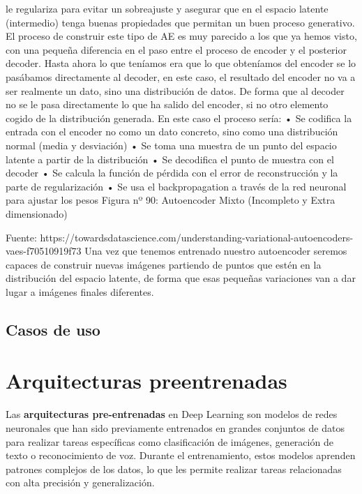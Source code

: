 \documentclass[
  a4paper,
  DIV=11,
  numbers=noendperiod]{scrreprt}
\begin{document}
le regulariza para evitar un sobreajuste y asegurar que en el espacio
latente (intermedio) tenga buenas propiedades que permitan un buen
proceso generativo. El proceso de construir este tipo de AE es muy
parecido a los que ya hemos visto, con una pequeña diferencia en el paso
entre el proceso de encoder y el posterior decoder. Hasta ahora lo que
teníamos era que lo que obteníamos del encoder se lo pasábamos
directamente al decoder, en este caso, el resultado del encoder no va a
ser realmente un dato, sino una distribución de datos. De forma que al
decoder no se le pasa directamente lo que ha salido del encoder, si no
otro elemento cogido de la distribución generada. En este caso el
proceso sería: • Se codifica la entrada con el encoder no como un dato
concreto, sino como una distribución normal (media y desviación) • Se
toma una muestra de un punto del espacio latente a partir de la
distribución • Se decodifica el punto de muestra con el decoder • Se
calcula la función de pérdida con el error de reconstrucción y la parte
de regularización • Se usa el backpropagation a través de la red
neuronal para ajustar los pesos Figura nº 90: Autoencoder Mixto
(Incompleto y Extra dimensionado)

Fuente:
https://towardsdatascience.com/understanding-variational-autoencoders-vaes-f70510919f73
Una vez que tenemos entrenado nuestro autoencoder seremos capaces de
construir nuevas imágenes partiendo de puntos que estén en la
distribución del espacio latente, de forma que esas pequeñas variaciones
van a dar lugar a imágenes finales diferentes.

\subsection{Casos de uso}\label{casos-de-uso}

\section{Arquitecturas preentrenadas}\label{arquitecturas-preentrenadas}

Las \textbf{arquitecturas pre-entrenadas} en Deep Learning son modelos
de redes neuronales que han sido previamente entrenados en grandes
conjuntos de datos para realizar tareas específicas como clasificación
de imágenes, generación de texto o reconocimiento de voz. Durante el
entrenamiento, estos modelos aprenden patrones complejos de los datos,
lo que les permite realizar tareas relacionadas con alta precisión y
generalización.
\end{document}
